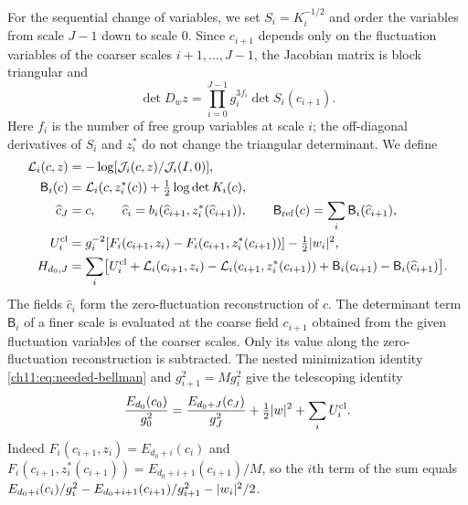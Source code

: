 For the sequential change of variables, we set $S_i=K_i^{-1/2}$ and order the variables from scale $J-1$ down to scale $0$. Since $c_{i+1}$ depends only on the fluctuation variables of the coarser scales $i+1,\dots,J-1$, the Jacobian matrix is block triangular and
\begin{equation}\label{ch11:eq:triangular-jacobian}
 \det D_wz=\prod_{i=0}^{J-1}g_i^{3f_i}\det S_i(c_{i+1}).
\end{equation}
Here $f_i$ is the number of free group variables at scale $i$; the off-diagonal derivatives of $S_i$ and $z_i^*$ do not change the triangular determinant. We define
\[
 \begin{split}
 \mathcal L_i(c,z)&=-\log[\mathcal J_i(c,z)/\mathcal J_i(I,0)],\\
 \mathsf B_i(c)&=\mathcal L_i(c,z_i^*(c))+\tfrac12\log\det K_i(c),\\
 \widehat c_J&=c,\qquad
 \widehat c_i=b_i(\widehat c_{i+1},z_i^*(\widehat c_{i+1})),\qquad
 \mathsf B_{\mathrm{ref}}(c)=\sum_i\mathsf B_i(\widehat c_{i+1}),\\
 U_i^{\mathrm{cl}}&=g_i^{-2}[F_i(c_{i+1},z_i)-F_i(c_{i+1},z_i^*(c_{i+1}))]-\tfrac12\lvert w_i\rvert^2,\\
 H_{d_0,J}&=\sum_i\bigl[U_i^{\mathrm{cl}}+\mathcal L_i(c_{i+1},z_i)-\mathcal L_i(c_{i+1},z_i^*(c_{i+1}))
 +\mathsf B_i(c_{i+1})-\mathsf B_i(\widehat c_{i+1})\bigr].
 \end{split}
\]
The fields $\widehat c_i$ form the zero-fluctuation reconstruction of $c$. The determinant term $\mathsf B_i$ of a finer scale is evaluated at the coarse field $c_{i+1}$ obtained from the given fluctuation variables of the coarser scales. Only its value along the zero-fluctuation reconstruction is subtracted. The nested minimization identity \eqref{ch11:eq:needed-bellman} and $g_{i+1}^2=Mg_i^2$ give the telescoping identity
\begin{equation}\label{ch11:eq:action-telescope}
 \frac{E_{d_0}(c_0)}{g_0^2}=\frac{E_{d_0+J}(c_J)}{g_J^2}+\tfrac12\lvert w\rvert^2+\sum_iU_i^{\mathrm{cl}}.
\end{equation}
Indeed $F_i(c_{i+1},z_i)=E_{d_0+i}(c_i)$ and $F_i(c_{i+1},z_i^*(c_{i+1}))=E_{d_0+i+1}(c_{i+1})/M$, so the $i$th term of the sum equals $E_{d_0+i}(c_i)/g_i^2-E_{d_0+i+1}(c_{i+1})/g_{i+1}^2-\lvert w_i\rvert^2/2$.

